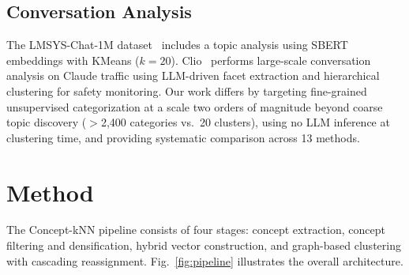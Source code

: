 \documentclass[conference]{IEEEtran}
\begin{document}
\subsection{Conversation Analysis}

The LMSYS-Chat-1M dataset~\cite{zheng2024lmsys} includes a topic analysis using SBERT embeddings with KMeans ($k\!=\!20$). Clio~\cite{tamkin2024clio} performs large-scale conversation analysis on Claude traffic using LLM-driven facet extraction and hierarchical clustering for safety monitoring. Our work differs by targeting fine-grained unsupervised categorization at a scale two orders of magnitude beyond coarse topic discovery ($>$2,400 categories vs.\ 20 clusters), using no LLM inference at clustering time, and providing systematic comparison across 13 methods.

\section{Method}

The Concept-kNN pipeline consists of four stages: concept extraction, concept filtering and densification, hybrid vector construction, and graph-based clustering with cascading reassignment. Fig.~\ref{fig:pipeline} illustrates the overall architecture.
\end{document}
